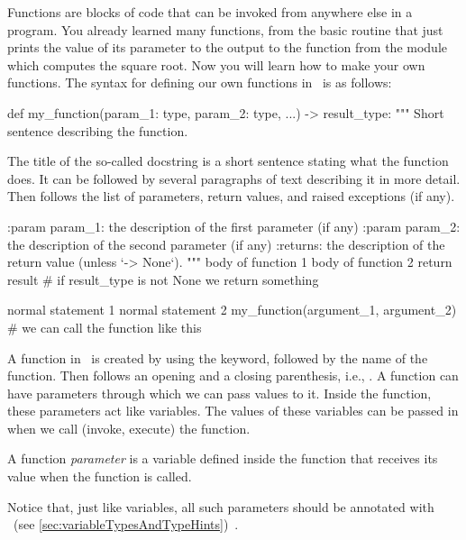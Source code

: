 %
%
Functions are blocks of code that can be invoked from anywhere else in a program.
You already learned many functions, from the basic  routine that just prints the value of its parameter to the output to the  function from the  module which computes the square root.
Now you will learn how to make your own functions.%
%
%
\label{sec:definingFunctions}%
%
%
The syntax for defining our own functions in \python\ is as follows:%
%
\begin{pythonSyntax}
def my_function(param_1: type, param_2: type, ...) -> result_type:
    """
    Short sentence describing the function.

    The title of the so-called docstring is a short sentence stating
    what the function does. It can be followed by several paragraphs of
    text describing it in more detail. Then follows the list of
    parameters, return values, and raised exceptions (if any).

    :param param_1: the description of the first parameter (if any)
    :param param_2: the description of the second parameter (if any)
    :returns: the description of the return value (unless `-> None`).
    """
    body of function 1
    body of function 2
    return result  # if result_type is not None we return something


normal statement 1
normal statement 2
my_function(argument_1, argument_2)  # we can call the function like this
\end{pythonSyntax}
%
A function in \python\ is created by using the  keyword, followed by the name of the function.%
%
%
%
Then follows an opening and a closing parenthesis, i.e., \pythonIdx{(\idxdots)}.
A function can have parameters through which we can pass values to it.
Inside the function, these parameters act like variables.
The values of these variables can be passed in when we call (invoke, execute) the function.%
%
\begin{definition}[Parameter]%
A function \emph{parameter} is a variable defined inside the function that receives its value when the function is called.%
\end{definition}%
%
Notice that, just like variables, all such parameters should be annotated with ~(see \cref{sec:variableTypesAndTypeHints})~\cite{PEP3107}.

